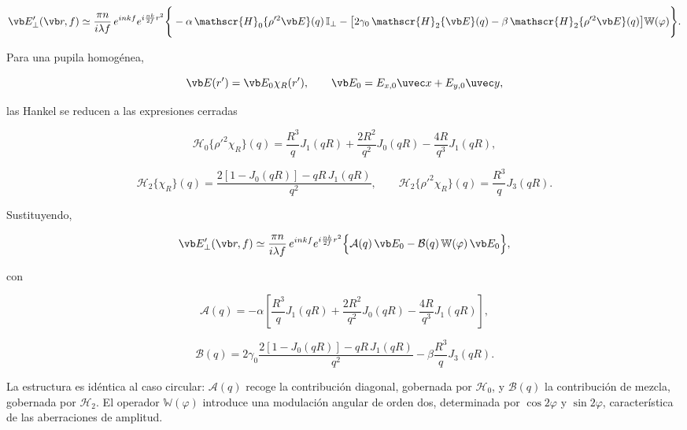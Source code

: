 \begin{equation}
\vb E'_\perp(\vb r, f)
\simeq
\frac{\pi n}{i\lambda f}\,e^{inkf}e^{i\frac{nk}{2f}r^2}
\Bigg\{
-\alpha\,\mathscr{H}_0\{\rho'^2\vb E\}(q)\,\mathbb{I}_\perp
-
\big[
2\gamma_0\,\mathscr{H}_2\{\vb E\}(q)
-
\beta\,\mathscr{H}_2\{\rho'^2\vb E\}(q)
\big]\mathbb{W}(\varphi)
\Bigg\}.
\label{eq:E_field_cartesian_paraxial}
\end{equation}

Para una pupila homogénea,

\begin{equation}
\vb E(r')
=
\vb E_0\chi_R(r'),
\qquad
\vb E_0
=
E_{x,0}\uvec x
+
E_{y,0}\uvec y,
\end{equation}

las Hankel se reducen a las expresiones cerradas

\begin{equation}
\mathscr{H}_0\{\rho'^2\chi_R\}(q)
=
\frac{R^3}{q}J_1(qR)
+
\frac{2R^2}{q^2}J_0(qR)
-
\frac{4R}{q^3}J_1(qR),
\end{equation}

\begin{equation}
\mathscr{H}_2\{\chi_R\}(q)
=
\frac{
2[1-J_0(qR)]
-
qR\,J_1(qR)
}
{q^2},
\qquad
\mathscr{H}_2\{\rho'^2\chi_R\}(q)
=
\frac{R^3}{q}J_3(qR).
\end{equation}

Sustituyendo,

\begin{equation}
\vb E'_\perp(\vb r, f)
\simeq
\frac{\pi n}{i\lambda f}\,e^{inkf}e^{i\frac{nk}{2f}r^2}
\Big\{
\mathcal{A}(q)\,\vb E_0
-
\mathcal{B}(q)\,\mathbb{W}(\varphi)\,\vb E_0
\Big\},
\label{eq:E_field_cartesian_homogeneous}
\end{equation}

con

\begin{equation}
\mathcal{A}(q)
=
-\alpha
\left[
\frac{R^3}{q}J_1(qR)
+
\frac{2R^2}{q^2}J_0(qR)
-
\frac{4R}{q^3}J_1(qR)
\right],
\end{equation}

\begin{equation}
\mathcal{B}(q)
=
2\gamma_0
\frac{
2[1-J_0(qR)]
-
qR\,J_1(qR)
}
{q^2}
-
\beta
\frac{R^3}{q}J_3(qR).
\end{equation}

La estructura es idéntica al caso circular: $\mathcal{A}(q)$ recoge la contribución diagonal, gobernada por $\mathscr H_0$, y $\mathcal{B}(q)$ la contribución de mezcla, gobernada por $\mathscr H_2$. El operador $\mathbb{W}(\varphi)$ introduce una modulación angular de orden dos, determinada por $\cos2\varphi$ y $\sin2\varphi$, característica de las aberraciones de amplitud.


